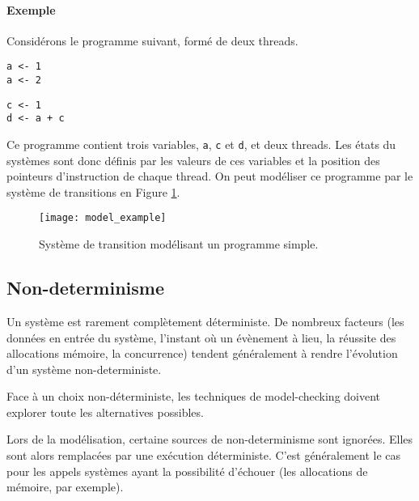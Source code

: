 \paragraph{Exemple}

Considérons le programme suivant, formé de deux threads.

\noindent\begin{minipage}{.45\textwidth}
\begin{lstlisting}[caption=Thread 1, frame=tlrb]
a <- 1
a <- 2
\end{lstlisting}
\end{minipage}\hfill
\begin{minipage}{.45\textwidth}
\begin{lstlisting}[caption=Thread 2,frame=tlrb]
c <- 1
d <- a + c
\end{lstlisting}
\end{minipage}

Ce programme contient trois variables, \lstinline!a!, \lstinline!c! et
\lstinline!d!, et deux threads. Les états du systèmes sont donc définis par les
valeurs de ces variables et la position des pointeurs d'instruction de chaque
thread. On peut modéliser ce programme par le système de transitions en Figure
\ref{fig:model_example}.

\begin{figure}
\begin{center}
\texttt{[image: model\_example]}
\end{center}
\caption{Système de transition modélisant un programme simple.}
\label{fig:model_example}
\end{figure}

\subsection{Non-determinisme}

Un système est rarement complètement déterministe. De nombreux facteurs (les
données en entrée du système, l'instant où un évènement à lieu, la réussite des
allocations mémoire, la concurrence) tendent généralement à rendre l'évolution
d'un système non-deterministe.

Face à un choix non-déterministe, les techniques de model-checking doivent
explorer toute les alternatives possibles.

Lors de la modélisation, certaine sources de non-determinisme sont ignorées.
Elles sont alors remplacées par une exécution déterministe.
C'est généralement le cas pour les appels systèmes ayant la possibilité
d'échouer (les allocations de mémoire, par exemple).

